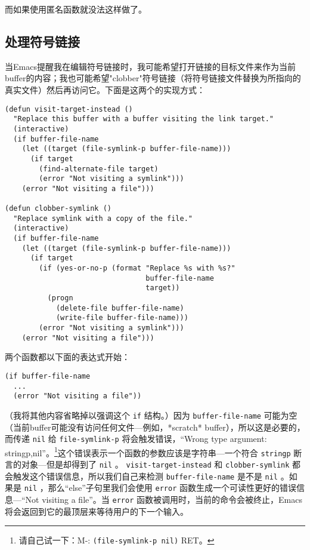 而如果使用匿名函数就没法这样做了。

\subsection{处理符号链接}
\label{section:02-Handling-the-Symlink}

当Emacs提醒我在编辑符号链接时，我可能希望打开链接的目标文件来作为当前buffer的内容；我也可能希望"clobber"符号链接（将符号链接文件替换为所指向的真实文件）然后再访问它。下面是这两个的实现方式：

\begin{verbatim}
(defun visit-target-instead ()
  "Replace this buffer with a buffer visiting the link target."
  (interactive)
  (if buffer-file-name
    (let ((target (file-symlink-p buffer-file-name)))
      (if target
        (find-alternate-file target)
        (error "Not visiting a symlink")))
    (error "Not visiting a file")))

(defun clobber-symlink ()
  "Replace symlink with a copy of the file."
  (interactive)
  (if buffer-file-name
    (let ((target (file-symlink-p buffer-file-name)))
      (if target
        (if (yes-or-no-p (format "Replace %s with %s?"
                                 buffer-file-name
                                 target))
          (progn
            (delete-file buffer-file-name)
            (write-file buffer-file-name)))
        (error "Not visiting a symlink")))
    (error "Not visiting a file")))
\end{verbatim}

两个函数都以下面的表达式开始：

\begin{verbatim}
(if buffer-file-name
  ...
  (error "Not visiting a file"))
\end{verbatim}

（我将其他内容省略掉以强调这个 \texttt{if} 结构。）因为 \texttt{buffer-file-name} 可能为空（当前buffer可能没有访问任何文件---例如，*scratch* buffer），所以这是必要的，而传递 \texttt{nil} 给 \texttt{file-symlink-p} 将会触发错误，“Wrong type argument: stringp,nil”。\footnote{请自己试一下：M-: \texttt{(file-symlink-p nil)} RET。}这个错误表示一个函数的参数应该是字符串---一个符合 \texttt{stringp} 断言的对象---但是却得到了 \texttt{nil} 。 \texttt{visit-target-instead} 和 \texttt{clobber-symlink} 都会触发这个错误信息，所以我们自己来检测 \texttt{buffer-file-name} 是不是 \texttt{nil} 。如果是 \texttt{nil} ，那么“else”子句里我们会使用 \texttt{error} 函数生成一个可读性更好的错误信息---“Not visiting a file”。当 \texttt{error} 函数被调用时，当前的命令会被终止，Emacs将会返回到它的最顶层来等待用户的下一个输入。

